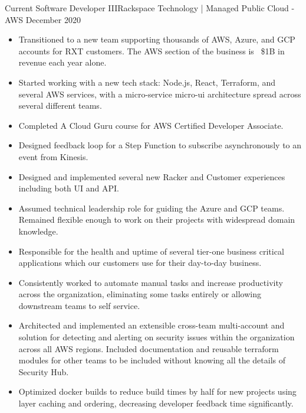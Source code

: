 \begin{experiences}
  \experience
    {Current}       {Software Developer III}{Rackspace Technology | Managed Public Cloud - AWS}
    {December 2020} {
                      \begin{itemize}
                        \item Transitioned to a new team supporting thousands of AWS, Azure, and GCP accounts for RXT customers. The AWS section of the business is ~\$1B in revenue each year alone.
                        \item Started working with a new tech stack: Node.js, React, Terraform, and several AWS services, with a micro-service micro-ui architecture spread across several different teams.
                        \item Completed A Cloud Guru course for AWS Certified Developer Associate.
                        \item Designed feedback loop for a Step Function to subscribe asynchronously to an event from Kinesis.
                        \item Designed and implemented several new Racker and Customer experiences including both UI and API.
                        \item Assumed technical leadership role for guiding the Azure and GCP teams. Remained flexible enough to work on their projects with widespread domain knowledge.
                        \item Responsible for the health and uptime of several tier-one business critical applications which our customers use for their day-to-day business.
                        \item Consistently worked to automate manual tasks and increase productivity across the organization, eliminating some tasks entirely or allowing downstream teams to self service.
                        \item Architected and implemented an extensible cross-team multi-account  and  solution for detecting and alerting on security issues within the organization across all AWS regions. Included documentation and reusable terraform modules for other teams to be included without knowing all the details of Security Hub.
                        \item Optimized docker builds to reduce build times by half for new projects using layer caching and ordering, decreasing developer feedback time significantly.

\end{itemize}}
\end{experiences}
